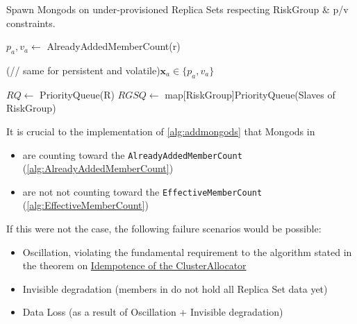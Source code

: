 \begin{algorithm}[H]
\label{alg:addmongods}
\caption{Spawn Mongods on under-provisioned Replica Sets respecting RiskGroup \& p/v constraints.}

$p_a, v_a \gets $ AlreadyAddedMemberCount(r)

\ForEach(// same for persistent and volatile){$\textbf{x}_a \in \{p_a, v_a\}$}{

	$RQ \gets$ PriorityQueue(R)\;%
	$RGSQ \gets$ map[RiskGroup]PriorityQueue(Slaves of RiskGroup)\;%
	

}

\end{algorithm}

It is crucial to the implementation of \ref{alg:addmongods} that Mongods in 
\begin{itemize}
  \item are counting toward the \texttt{AlreadyAddedMemberCount} (\ref{alg:AlreadyAddedMemberCount})
  \item are not not counting toward the \texttt{EffectiveMemberCount} (\ref{alg:EffectiveMemberCount})
\end{itemize}

If this were not the case, the following failure scenarios would be possible:
\begin{itemize}
  \item Oscillation, violating the fundamental requirement to the algorithm stated in the theorem on \hyperref[theorem:idempotence_clusterallocator]{Idempotence of the ClusterAllocator}
  \item Invisible degradation (members in  do not hold all Replica Set data yet)
  \item Data Loss (as a result of Oscillation + Invisible degradation)
\end{itemize}
